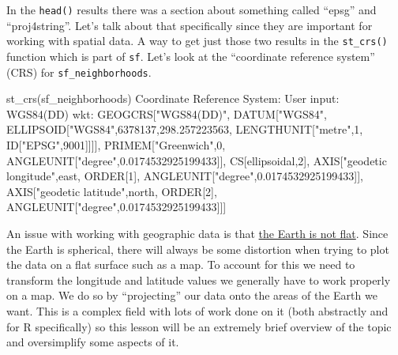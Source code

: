 \documentclass[
  12pt,
]{book}
\newenvironment{Shaded}{\begin{snugshade}}{\end{snugshade}}
\newcommand{\DecValTok}[1]{\textcolor[rgb]{0.06,0.06,0.06}{#1}}
\newcommand{\FloatTok}[1]{\textcolor[rgb]{0.06,0.06,0.06}{#1}}
\newcommand{\FunctionTok}[1]{\textcolor[rgb]{0,0,0}{#1}}
\newcommand{\NormalTok}[1]{#1}
\newcommand{\SpecialCharTok}[1]{\textcolor[rgb]{0,0,0}{#1}}
\newcommand{\StringTok}[1]{\textcolor[rgb]{0.5,0.5,0.5}{#1}}
\begin{document}
In the \texttt{head()} results there was a section about something called ``epsg'' and ``proj4string''. Let's talk about that specifically since they are important for working with spatial data. A way to get just those two results in the \texttt{st\_crs()} function which is part of \texttt{sf}. Let's look at the ``coordinate reference system'' (CRS) for \texttt{sf\_neighborhoods}.

\begin{Shaded}
\begin{Highlighting}[]
\FunctionTok{st\_crs}\NormalTok{(sf\_neighborhoods)}
\NormalTok{Coordinate Reference System}\SpecialCharTok{:}
\NormalTok{  User input}\SpecialCharTok{:} \FunctionTok{WGS84}\NormalTok{(DD) }
\NormalTok{  wkt}\SpecialCharTok{:}
\NormalTok{GEOGCRS[}\StringTok{"WGS84(DD)"}\NormalTok{,}
\NormalTok{    DATUM[}\StringTok{"WGS84"}\NormalTok{,}
\NormalTok{        ELLIPSOID[}\StringTok{"WGS84"}\NormalTok{,}\DecValTok{6378137}\NormalTok{,}\FloatTok{298.257223563}\NormalTok{,}
\NormalTok{            LENGTHUNIT[}\StringTok{"metre"}\NormalTok{,}\DecValTok{1}\NormalTok{,}
\NormalTok{                ID[}\StringTok{"EPSG"}\NormalTok{,}\DecValTok{9001}\NormalTok{]]]],}
\NormalTok{    PRIMEM[}\StringTok{"Greenwich"}\NormalTok{,}\DecValTok{0}\NormalTok{,}
\NormalTok{        ANGLEUNIT[}\StringTok{"degree"}\NormalTok{,}\FloatTok{0.0174532925199433}\NormalTok{]],}
\NormalTok{    CS[ellipsoidal,}\DecValTok{2}\NormalTok{],}
\NormalTok{        AXIS[}\StringTok{"geodetic longitude"}\NormalTok{,east,}
\NormalTok{            ORDER[}\DecValTok{1}\NormalTok{],}
\NormalTok{            ANGLEUNIT[}\StringTok{"degree"}\NormalTok{,}\FloatTok{0.0174532925199433}\NormalTok{]],}
\NormalTok{        AXIS[}\StringTok{"geodetic latitude"}\NormalTok{,north,}
\NormalTok{            ORDER[}\DecValTok{2}\NormalTok{],}
\NormalTok{            ANGLEUNIT[}\StringTok{"degree"}\NormalTok{,}\FloatTok{0.0174532925199433}\NormalTok{]]]}
\end{Highlighting}
\end{Shaded}

An issue with working with geographic data is that \href{https://en.wikipedia.org/wiki/Spherical_Earth}{the Earth is not flat}. Since the Earth is spherical, there will always be some distortion when trying to plot the data on a flat surface such as a map. To account for this we need to transform the longitude and latitude values we generally have to work properly on a map. We do so by ``projecting'' our data onto the areas of the Earth we want. This is a complex field with lots of work done on it (both abstractly and for R specifically) so this lesson will be an extremely brief overview of the topic and oversimplify some aspects of it.
\end{document}
